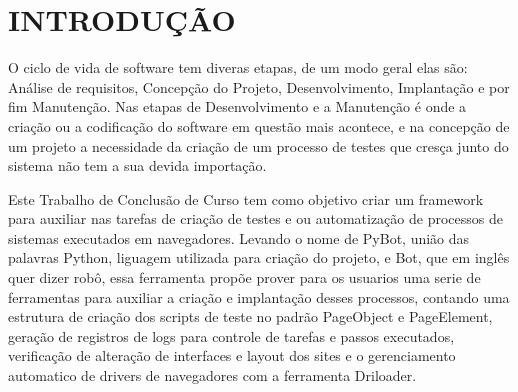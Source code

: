 %
%

\chapter{INTRODUÇÃO}\label{chap:introducao}

O ciclo de vida de software tem diveras etapas, de um modo geral elas são: Análise de requisitos, Concepção do Projeto, Desenvolvimento, Implantação e por fim Manutenção.
Nas etapas de Desenvolvimento e a Manutenção é onde a criação ou a codificação do software em questão mais acontece, e na concepção de um projeto a necessidade da criação
de um processo de testes que cresça junto do sistema não tem a sua devida importação.


Este Trabalho de Conclusão de Curso tem como objetivo criar um framework para auxiliar nas tarefas de criação de testes e ou automatização de processos de sistemas executados em navegadores.
Levando o nome de PyBot, união das palavras Python, liguagem utilizada para criação do projeto, e Bot, que em inglês quer dizer robô, essa ferramenta propõe prover para os usuarios uma serie
de ferramentas para auxiliar a criação e implantação desses processos, contando uma estrutura de criação dos scripts de teste no padrão PageObject e PageElement, geração de registros de logs
para controle de tarefas e passos executados, verificação de alteração de interfaces e layout dos sites e o gerenciamento automatico de drivers de navegadores com a ferramenta Driloader.